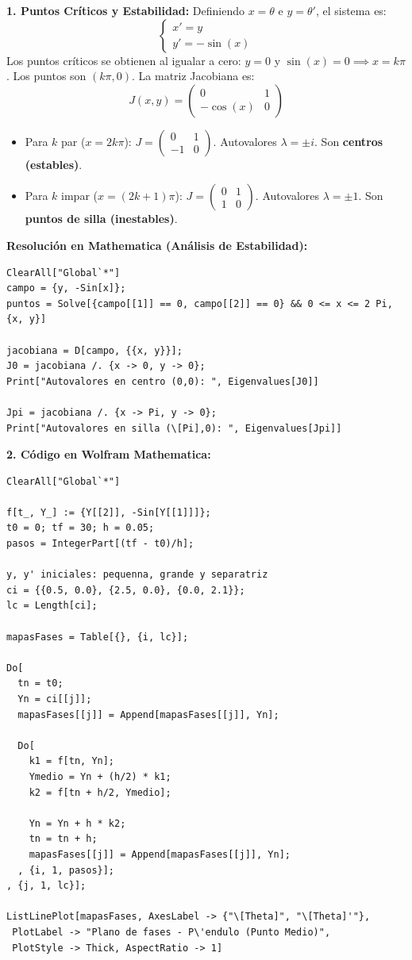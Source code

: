 \begin{sol}
\textbf{1. Puntos Críticos y Estabilidad:}
Definiendo $x = \theta$ e $y = \theta'$, el sistema es:
$$ \begin{cases} x' = y \\ y' = -\sin(x) \end{cases} $$
Los puntos críticos se obtienen al igualar a cero: $y = 0$ y $\sin(x) = 0 \implies x = k\pi$. Los puntos son $(k\pi, 0)$.
La matriz Jacobiana es:
$$ J(x,y) = \begin{pmatrix} 0 & 1 \\ -\cos(x) & 0 \end{pmatrix} $$
\begin{itemize}[label=-]
    \item Para $k$ par ($x=2k\pi$): $J = \begin{pmatrix} 0 & 1 \\ -1 & 0 \end{pmatrix}$. Autovalores $\lambda = \pm i$. Son \textbf{centros (estables)}.
    \item Para $k$ impar ($x=(2k+1)\pi$): $J = \begin{pmatrix} 0 & 1 \\ 1 & 0 \end{pmatrix}$. Autovalores $\lambda = \pm 1$. Son \textbf{puntos de silla (inestables)}.
\end{itemize}

\textbf{Resolución en Mathematica (Análisis de Estabilidad):}
\begin{lstlisting}
ClearAll["Global`*"]
campo = {y, -Sin[x]};
puntos = Solve[{campo[[1]] == 0, campo[[2]] == 0} && 0 <= x <= 2 Pi, {x, y}]

jacobiana = D[campo, {{x, y}}];
J0 = jacobiana /. {x -> 0, y -> 0};
Print["Autovalores en centro (0,0): ", Eigenvalues[J0]]

Jpi = jacobiana /. {x -> Pi, y -> 0};
Print["Autovalores en silla (\[Pi],0): ", Eigenvalues[Jpi]]
\end{lstlisting}

\textbf{2. Código en Wolfram Mathematica:}
\begin{lstlisting}
ClearAll["Global`*"]

f[t_, Y_] := {Y[[2]], -Sin[Y[[1]]]};
t0 = 0; tf = 30; h = 0.05;
pasos = IntegerPart[(tf - t0)/h];

y, y' iniciales: pequenna, grande y separatriz 
ci = {{0.5, 0.0}, {2.5, 0.0}, {0.0, 2.1}};
lc = Length[ci];

mapasFases = Table[{}, {i, lc}];

Do[
  tn = t0; 
  Yn = ci[[j]];
  mapasFases[[j]] = Append[mapasFases[[j]], Yn];
  
  Do[
    k1 = f[tn, Yn];
    Ymedio = Yn + (h/2) * k1;
    k2 = f[tn + h/2, Ymedio];
    
    Yn = Yn + h * k2;
    tn = tn + h;
    mapasFases[[j]] = Append[mapasFases[[j]], Yn];
  , {i, 1, pasos}];
, {j, 1, lc}];

ListLinePlot[mapasFases, AxesLabel -> {"\[Theta]", "\[Theta]'"},
 PlotLabel -> "Plano de fases - P\'endulo (Punto Medio)",
 PlotStyle -> Thick, AspectRatio -> 1]
\end{lstlisting}
\end{sol}

